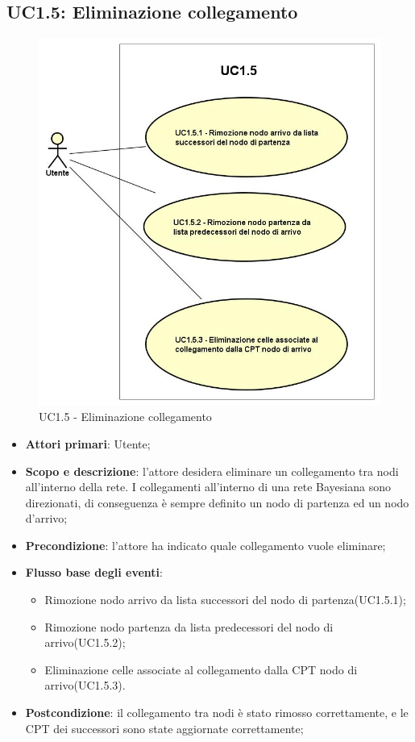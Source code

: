 \subsection{UC1.5: Eliminazione collegamento} 
\hypertarget{UC1.5}{} 
\begin{figure} [H]
	\centering
	\includegraphics[scale=0.45]{Img/UC1-5} 
	\caption{UC1.5 - Eliminazione collegamento} \label{} 
\end{figure} 
\begin{itemize} 
	\item{\textbf{Attori primari}: Utente;} 
	\item{\textbf{Scopo e descrizione}: l'attore desidera eliminare un collegamento tra nodi all'interno della rete. I collegamenti all'interno di una rete Bayesiana sono direzionati, di conseguenza è sempre definito un nodo di partenza ed un nodo d'arrivo;} 
	\item{\textbf{Precondizione}: l'attore ha indicato quale collegamento vuole eliminare;} 
	\item{\textbf{Flusso base degli eventi}: } 
	\begin{itemize} 
		\item{Rimozione nodo arrivo da lista successori del nodo di partenza(UC1.5.1);} 
		\item{Rimozione nodo partenza da lista predecessori del nodo di arrivo(UC1.5.2);} 
		\item{Eliminazione celle associate al collegamento dalla CPT nodo di arrivo(UC1.5.3).} 
	\end{itemize} 
	\item{\textbf{Postcondizione}: il collegamento tra nodi è stato rimosso correttamente, e le CPT dei successori sono state aggiornate correttamente;} 
\end{itemize} 
